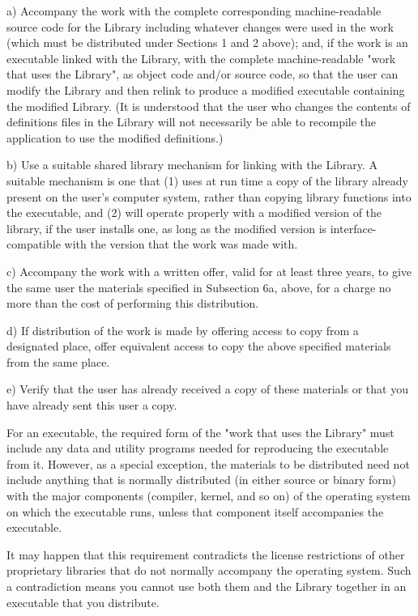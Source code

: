\begin{DoxyCode}
    a) Accompany the work with the complete corresponding
    machine-readable source code for the Library including whatever
    changes were used in the work (which must be distributed under
    Sections 1 and 2 above); and, if the work is an executable linked
    with the Library, with the complete machine-readable "work that
    uses the Library", as object code and/or source code, so that the
    user can modify the Library and then relink to produce a modified
    executable containing the modified Library.  (It is understood
    that the user who changes the contents of definitions files in the
    Library will not necessarily be able to recompile the application
    to use the modified definitions.)

    b) Use a suitable shared library mechanism for linking with the
    Library.  A suitable mechanism is one that (1) uses at run time a
    copy of the library already present on the user's computer system,
    rather than copying library functions into the executable, and (2)
    will operate properly with a modified version of the library, if
    the user installs one, as long as the modified version is
    interface-compatible with the version that the work was made with.

    c) Accompany the work with a written offer, valid for at
    least three years, to give the same user the materials
    specified in Subsection 6a, above, for a charge no more
    than the cost of performing this distribution.

    d) If distribution of the work is made by offering access to copy
    from a designated place, offer equivalent access to copy the above
    specified materials from the same place.

    e) Verify that the user has already received a copy of these
    materials or that you have already sent this user a copy.

  For an executable, the required form of the "work that uses the
Library" must include any data and utility programs needed for
reproducing the executable from it.  However, as a special exception,
the materials to be distributed need not include anything that is
normally distributed (in either source or binary form) with the major
components (compiler, kernel, and so on) of the operating system on
which the executable runs, unless that component itself accompanies
the executable.

  It may happen that this requirement contradicts the license
restrictions of other proprietary libraries that do not normally
accompany the operating system.  Such a contradiction means you cannot
use both them and the Library together in an executable that you
distribute.


\end{DoxyCode}
